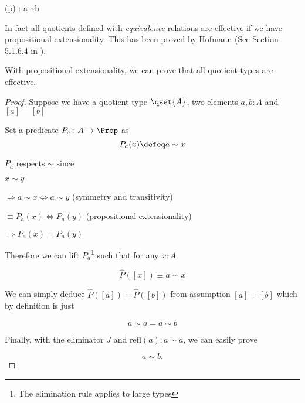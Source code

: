{(p) : a \sim b}

In fact all quotients defined with \emph{equivalence} relations are effective if we have propositional extensionality.
This has been proved by Hofmann (See Section 5.1.6.4 in \cite{hof:phd}).

\begin{theorem}\label{PUEF}
With propositional extensionality, we can prove that all quotient types are effective.
\end{theorem}
\begin{proof}

Suppose we have a quotient type $\qset{A}$, two elements $a, b : A$ and $[ a ] = [ b ]$


Set a predicate $P_a : A \to \Prop$ as 
$$P_a (x) \defeq a \sim x$$

$P_a$ respects $\sim$ since

$x \sim y$

$\Rightarrow a \sim x \iff a \sim y$ (symmetry and transitivity)

$\equiv P_a(x) \iff P_a(y)$ (propositional extensionality)

$\Rightarrow P_a(x) = P_a(y)$

Therefore we can lift $P_a$\footnote{The elimination rule applies to large types} such that for any $x : A$

$$\hat{P} ([ x ]) \equiv a \sim x$$


We can simply deduce $\hat{P} ([ a ]) = \hat{P} ([ b ])$ from assumption $[ a ] = [ b ]$ which by definition
is just

$$a \sim a  = a \sim b$$ 

Finally, with the eliminator $J$ and $\text{refl}(a) : a \sim a$, we can easily prove

$$a \sim b.$$

\end{proof}





